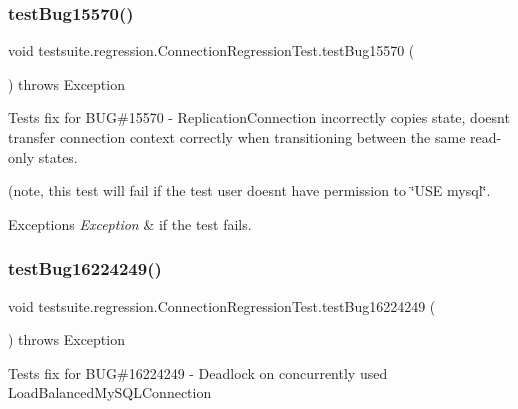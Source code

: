 \subsubsection{\texorpdfstring{test\+Bug15570()}{testBug15570()}}
{\footnotesize\ttfamily void testsuite.\+regression.\+Connection\+Regression\+Test.\+test\+Bug15570 (\begin{DoxyParamCaption}{ }\end{DoxyParamCaption}) throws Exception}

Tests fix for B\+UG\#15570 -\/ Replication\+Connection incorrectly copies state, doesn\textquotesingle{}t transfer connection context correctly when transitioning between the same read-\/only states.

(note, this test will fail if the test user doesn\textquotesingle{}t have permission to \char`\"{}\+U\+S\+E \textquotesingle{}mysql\textquotesingle{}\char`\"{}.


\begin{DoxyExceptions}{Exceptions}
{\em Exception} & if the test fails. \\
\hline
\end{DoxyExceptions}
\mbox{\label{classtestsuite_1_1regression_1_1_connection_regression_test_a24c8f315d33aa8259b7777c43e225b24}} 
\subsubsection{\texorpdfstring{test\+Bug16224249()}{testBug16224249()}}
{\footnotesize\ttfamily void testsuite.\+regression.\+Connection\+Regression\+Test.\+test\+Bug16224249 (\begin{DoxyParamCaption}{ }\end{DoxyParamCaption}) throws Exception}

Tests fix for B\+UG\#16224249 -\/ Deadlock on concurrently used Load\+Balanced\+My\+S\+Q\+L\+Connection


